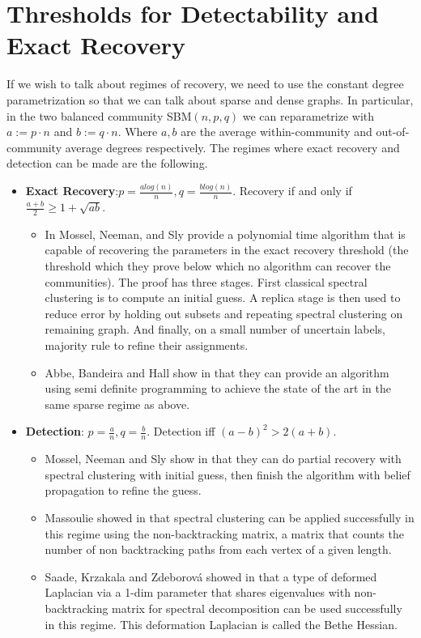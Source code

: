 \section{Thresholds for Detectability and Exact Recovery}

If we wish to talk about regimes of recovery, we need to use the constant degree parametrization so that we can talk about sparse and dense graphs.  In particular, in the two balanced community SBM$(n,p, q)$ we can reparametrize with $a :=  p \cdot n$ and $b := q \cdot n$.  Where $a, b$ are the average within-community and out-of-community average degrees respectively.  The regimes where exact recovery and detection can be made are the following. 

\begin{itemize}
    \item \textbf{Exact Recovery}:$p=\frac{alog(n)}{n}, q = \frac{b log(n)}{n}$.  Recovery if and only if $\frac{a+b}{2} \geq 1 + \sqrt{ab}$.
    \begin{itemize}
        \item In \cite{MNS} Mossel, Neeman, and Sly provide a polynomial time algorithm that is capable of recovering the parameters in the exact recovery threshold (the threshold which they prove below which no algorithm can recover the communities).  The proof has three stages. First classical spectral clustering is to compute an initial guess. A replica stage is then used to reduce error by holding out subsets and repeating spectral clustering on remaining graph.  And finally, on a small number of uncertain labels, majority rule to refine their assignments. 
         \item Abbe, Bandeira and Hall show in \cite{ABH} that they can provide an algorithm using semi definite programming to achieve the state of the art in the same sparse regime as above. 
    \end{itemize}
    \item \textbf{Detection}: $p = \frac{a}{n}, q = \frac{b}{n}$.  Detection iff $(a-b)^2 > 2(a+b)$.
    \begin{itemize}
        \item Mossel, Neeman and Sly show in \cite{MNS_sparse} that they can do partial recovery with spectral clustering with initial guess, then finish the algorithm with belief propagation to refine the guess.  \\
        \item Massoulie showed in \cite{Massouli} that spectral clustering can be applied successfully in this regime using the non-backtracking matrix, a matrix that counts the number of non backtracking paths from each vertex of a given length.   \\
        \item Saade, Krzakala and Zdeborová showed in \cite{AFL} that a type of deformed Laplacian via a 1-dim parameter that shares eigenvalues with non-backtracking matrix for spectral decomposition can be used successfully in this regime.  This deformation Laplacian is called the Bethe Hessian.    
    \end{itemize}
   \end{itemize}
   
